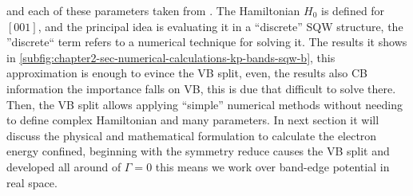 and each of these parameters taken from \cite{vurgaftman2020bands}. The Hamiltonian $H_{0}$ is defined for $\left[001\right]$, and the principal idea is evaluating it in a ``discrete'' SQW structure, the ''discrete`` term refers to a numerical technique for solving it. The results it shows in \cref{subfig:chapter2-sec-numerical-calculations-kp-bands-sqw-b}, this approximation is enough to evince the \gls{VB} split, even, the results also \gls{CB} information the importance falls on  \gls{VB}, this is due that difficult to solve there.  Then, the VB split allows applying ``simple'' numerical methods without needing to define complex Hamiltonian and many parameters. In next section it will discuss the physical and mathematical formulation to calculate the electron energy confined, beginning with the symmetry reduce causes the \gls{VB} split and developed all around of $\Gamma =0$ this means we work over band-edge potential in real space. 


